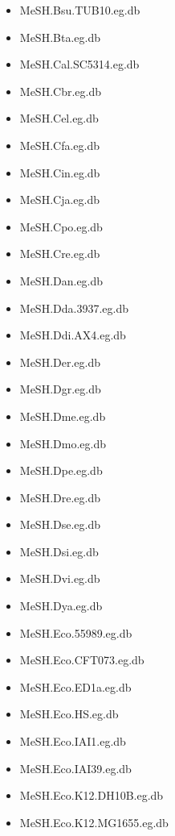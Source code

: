 \documentclass[margin,line,10pt]{res}
\newenvironment{list1}{
  \begin{list}{\ding{113}}{%
      \setlength{\itemsep}{0in}
      \setlength{\parsep}{0in} \setlength{\parskip}{0in}
      \setlength{\topsep}{0in} \setlength{\partopsep}{0in} 
      \setlength{\leftmargin}{0.17in}}}{\end{list}}
\begin{document}
\begin{resume}
\begin{list1}
\begin{multicols}{2}
\begin{itemize}
\item MeSH.Bsu.TUB10.eg.db
\item MeSH.Bta.eg.db 
\item MeSH.Cal.SC5314.eg.db
\item MeSH.Cbr.eg.db 
\item MeSH.Cel.eg.db
\item MeSH.Cfa.eg.db
\item MeSH.Cin.eg.db
\item MeSH.Cja.eg.db
\item MeSH.Cpo.eg.db
\item MeSH.Cre.eg.db  
\item MeSH.Dan.eg.db
\item MeSH.Dda.3937.eg.db
\item MeSH.Ddi.AX4.eg.db
\item MeSH.Der.eg.db 
\item MeSH.Dgr.eg.db 
\item MeSH.Dme.eg.db 
\item MeSH.Dmo.eg.db 
\item MeSH.Dpe.eg.db
\item MeSH.Dre.eg.db
\item MeSH.Dse.eg.db
\item MeSH.Dsi.eg.db
\item MeSH.Dvi.eg.db  
\item MeSH.Dya.eg.db
\item MeSH.Eco.55989.eg.db
\item MeSH.Eco.CFT073.eg.db
\item MeSH.Eco.ED1a.eg.db 
\item MeSH.Eco.HS.eg.db
\item MeSH.Eco.IAI1.eg.db 
\item MeSH.Eco.IAI39.eg.db 
\item MeSH.Eco.K12.DH10B.eg.db
\item MeSH.Eco.K12.MG1655.eg.db

\end{itemize}
\end{multicols}
\end{list1}
\end{resume}
\end{document}
